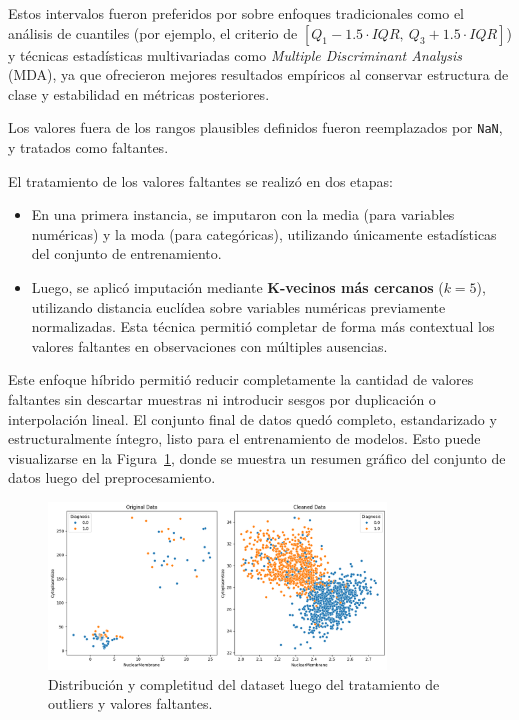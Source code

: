 \documentclass[11pt]{article}
\begin{document}
Estos intervalos fueron preferidos por sobre enfoques tradicionales como el análisis de cuantiles (por ejemplo, el criterio de $[Q_1 - 1.5 \cdot IQR,\ Q_3 + 1.5 \cdot IQR]$) y técnicas estadísticas multivariadas como \textit{Multiple Discriminant Analysis} (MDA), ya que ofrecieron mejores resultados empíricos al conservar estructura de clase y estabilidad en métricas posteriores. 

Los valores fuera de los rangos plausibles definidos fueron reemplazados por \texttt{NaN}, y tratados como faltantes.

El tratamiento de los valores faltantes se realizó en dos etapas:

\begin{itemize}
    \item En una primera instancia, se imputaron con la media (para variables numéricas) y la moda (para categóricas), utilizando únicamente estadísticas del conjunto de entrenamiento.
    \item Luego, se aplicó imputación mediante \textbf{K-vecinos más cercanos} ($k=5$), utilizando distancia euclídea sobre variables numéricas previamente normalizadas. Esta técnica permitió completar de forma más contextual los valores faltantes en observaciones con múltiples ausencias.
\end{itemize}

Este enfoque híbrido permitió reducir completamente la cantidad de valores faltantes sin descartar muestras ni introducir sesgos por duplicación o interpolación lineal. El conjunto final de datos quedó completo, estandarizado y estructuralmente íntegro, listo para el entrenamiento de modelos. Esto puede visualizarse en la Figura~\ref{fig:cleaned_data}, donde se muestra un resumen gráfico del conjunto de datos luego del preprocesamiento.

\begin{figure}[H]
    \centering
    \includegraphics[width=0.8\textwidth]{figures/cleaned_data.png}
    \caption{Distribución y completitud del dataset luego del tratamiento de outliers y valores faltantes.}
    \label{fig:cleaned_data}
\end{figure}
\end{document}
